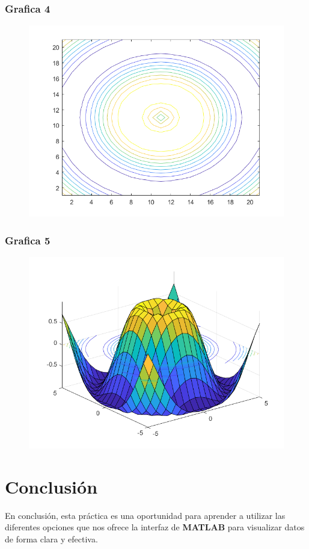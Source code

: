 \documentclass{article}
\begin{document}
	\subsubsection{Grafica 4}
	
	\begin{figure}[h]
		\centering
		\includegraphics[width=\textwidth]{grafica22d.png}
	\end{figure}
	
	\newpage
	
	\subsubsection{Grafica 5}
	
	\begin{figure}[h]
		\centering
		\includegraphics[width=\textwidth]{grafica22e.png}
	\end{figure}
	
	\newpage
	
	\newpage
	\section{Conclusión}
	
	En conclusión, esta práctica es una oportunidad para aprender a utilizar las diferentes opciones que nos ofrece la interfaz de \textbf{MATLAB} para visualizar datos de forma clara y efectiva.
	
\end{document}
